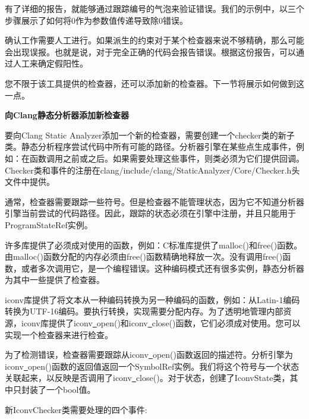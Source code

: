 有了详细的报告，就能够通过跟踪编号的气泡来验证错误。我们的示例中，以三个步骤展示了如何将0作为参数值传递导致除0错误。\par
 
确认工作需要人工进行。如果派生的约束对于某个检查器来说不够精确，那么可能会出现误报。也就是说，对于完全正确的代码会报告错误。根据这份报告，可以通过人工来确定假阳性。\par

您不限于该工具提供的检查器，还可以添加新的检查器。下一节将展示如何做到这一点。\par


\hspace*{\fill} \par %
\textbf{向Clang静态分析器添加新检查器}

要向Clang Static Analyzer添加一个新的检查器，需要创建一个checker类的新子类。静态分析程序尝试代码中所有可能的路径。分析器引擎在某些点生成事件，例如：在函数调用之前或之后。如果需要处理这些事件，则类必须为它们提供回调。Checker类和事件的注册在clang/include/clang/Stat\allowbreak icAnalyzer/Core/Checker.h头文件中提供。\par

通常，检查器需要跟踪一些符号。但是检查器不能管理状态，因为它不知道分析器引擎当前尝试的代码路径。因此，跟踪的状态必须在引擎中注册，并且只能用于ProgramStateRef实例。\par

许多库提供了必须成对使用的函数，例如：C标准库提供了malloc()和free()函数。由malloc()函数分配的内存必须由free()函数精确地释放一次。没有调用free()函数，或者多次调用它，是一个编程错误。这种编码模式还有很多实例，静态分析器为其中一些提供了检查器。\par

iconv库提供了将文本从一种编码转换为另一种编码的函数，例如：从Latin-1编码转换为UTF-16编码。要执行转换，实现需要分配内存。为了透明地管理内部资源，iconv库提供了iconv\underline{~}open()和iconv\underline{~}close()函数，它们必须成对使用。您可以实现一个检查器来进行检查。\par

为了检测错误，检查器需要跟踪从iconv\underline{~}open()函数返回的描述符。分析引擎为iconv\underline{~}open()函数的返回值返回一个SymbolRef实例。我们将这个符号与一个状态关联起来，以反映是否调用了iconv\underline{~}close()。对于状态，创建了IconvState类，其中只封装了一个bool值。\par

新IconvChecker类需要处理的四个事件:\par


